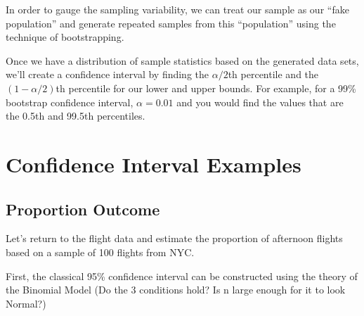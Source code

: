 \documentclass[]{book}
\newenvironment{Shaded}{\begin{snugshade}}{\end{snugshade}}
\newcommand{\DataTypeTok}[1]{\textcolor[rgb]{0.13,0.29,0.53}{#1}}
\newcommand{\DecValTok}[1]{\textcolor[rgb]{0.00,0.00,0.81}{#1}}
\newcommand{\KeywordTok}[1]{\textcolor[rgb]{0.13,0.29,0.53}{\textbf{#1}}}
\newcommand{\NormalTok}[1]{#1}
\newcommand{\OperatorTok}[1]{\textcolor[rgb]{0.81,0.36,0.00}{\textbf{#1}}}
\newcommand{\StringTok}[1]{\textcolor[rgb]{0.31,0.60,0.02}{#1}}
\begin{document}
In order to gauge the sampling variability, we can treat our sample as our ``fake population'' and generate repeated samples from this ``population'' using the technique of bootstrapping.

Once we have a distribution of sample statistics based on the generated data sets, we'll create a confidence interval by finding the \(\alpha/2\)th percentile and the \((1-\alpha/2)\)th percentile for our lower and upper bounds. For example, for a 99\% bootstrap confidence interval, \(\alpha = 0.01\) and you would find the values that are the 0.5th and 99.5th percentiles.

\hypertarget{confidence-interval-examples}{%
\section{Confidence Interval Examples}\label{confidence-interval-examples}}

\hypertarget{proportion-outcome}{%
\subsection{Proportion Outcome}\label{proportion-outcome}}

Let's return to the flight data and estimate the proportion of afternoon flights based on a sample of 100 flights from NYC.

First, the classical 95\% confidence interval can be constructed using the theory of the Binomial Model (Do the 3 conditions hold? Is n large enough for it to look Normal?)

\begin{Shaded}
\end{Shaded}
\end{document}
